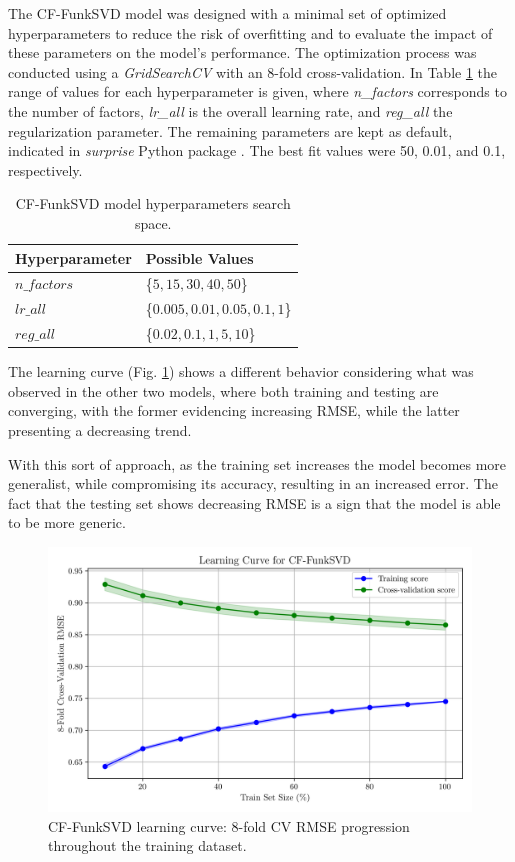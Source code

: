 \documentclass[conference]{IEEEtran}
\begin{document}
The CF-FunkSVD model was designed with a minimal set of optimized hyperparameters to reduce the risk of overfitting and to evaluate the impact of these parameters on the model's performance. The optimization process was conducted using a \textit{GridSearchCV} with an 8-fold cross-validation. In Table \ref{parametrosSVD} the range of values for each hyperparameter is given, where \textit{n\_factors} corresponds to the number of factors, \textit{lr\_all} is the overall learning rate, and \textit{reg\_all} the regularization parameter. The remaining parameters are kept as default, indicated in \textit{surprise} Python package \cite{surprise}. The best fit values were 50, 0.01, and 0.1, respectively.

\begin{table}[H]
\centering
\caption{CF-FunkSVD model hyperparameters search space.}
\label{parametrosSVD}
\begin{tabular}{ll}
\toprule
\textbf{Hyperparameter} & \textbf{Possible Values} \\
\midrule
$n\_factors$ & \{$5,15,30,40,50$\} \\ 
$lr\_all$ & \{$0.005, 0.01, 0.05, 0.1, 1$\} \\ 
$reg\_all$ & \{$0.02,0.1,1,5,10$\} \\ 
\bottomrule
\end{tabular}
\end{table}

The learning curve (Fig. \ref{fig:model03_learningcurve}) shows a different behavior considering what was observed in the other two models, where both training and testing are converging, with the former evidencing increasing RMSE, while the latter presenting a decreasing trend.

With this sort of approach, as the training set increases the model becomes more generalist, while compromising its accuracy, resulting in an increased error. The fact that the testing set shows decreasing RMSE is a sign that the model is able to be more generic.

\begin{figure}[H]
    \centering
    \includegraphics[width=1\linewidth]{assets/model03_learningcurve.png}
    \caption{CF-FunkSVD learning curve: 8-fold CV RMSE progression throughout the training dataset.}
    \label{fig:model03_learningcurve}
\end{figure}
\end{document}
